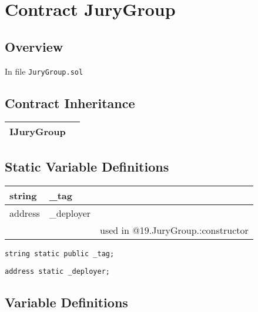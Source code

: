 
\chapter{Contract JuryGroup}

\minitoc

\section{Overview}


In file {\tt JuryGroup.sol}

\section{Contract Inheritance}


\noindent\begin{tabular}{|l|p{5cm}|}\hline
IJuryGroup & \\\hline
\end{tabular}


\section{Static Variable Definitions}


\ifsoltables
\noindent\begin{tabular}{|l|l|p{5cm}|}\hline
string & \_{}tag &  \\\hline
address & \_{}deployer &  \\\hline
 & & used in @19.JuryGroup.:constructor\\\hline
\end{tabular}
\fi


\begin{lstlisting}[firstnumber=11]
    string static public _tag;
\end{lstlisting}

\begin{lstlisting}[firstnumber=12]
    address static _deployer;
\end{lstlisting}

\section{Variable Definitions}


